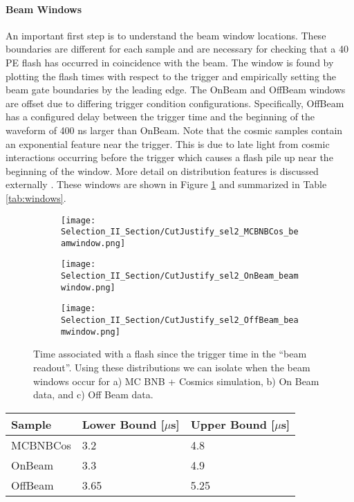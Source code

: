 \noindent \paragraph{Beam Windows} An important first step is to understand the beam window locations. These boundaries are different for each sample and are necessary for checking that a 40 PE flash has occurred in coincidence with the beam. The window is found by plotting the flash times with respect to the trigger and empirically setting the beam gate boundaries by the leading edge. The OnBeam and OffBeam windows are offset due to differing trigger condition configurations. Specifically, OffBeam has a configured delay between the trigger time and the beginning of the waveform of 400 ns larger than OnBeam. Note that the cosmic samples contain an exponential feature near the trigger. This is due to late light from cosmic interactions occurring before the trigger which causes a flash pile up near the beginning of the window. More detail on distribution features is discussed externally \cite{bib:davidcpot}. These windows are shown in Figure \ref{fig:misc_beamwindows} and summarized in Table \ref{tab:windows}.

\begin{figure}[h!]
\begin{subfigure}[b]{0.3\textwidth}
\texttt{[image: Selection\_II\_Section/CutJustify\_sel2\_MCBNBCos\_beamwindow.png]}
\caption{ }
\end{subfigure}
\hspace{3mm}
\begin{subfigure}[b]{0.3\textwidth}
\texttt{[image: Selection\_II\_Section/CutJustify\_sel2\_OnBeam\_beamwindow.png]}
\caption{ }
\end{subfigure}
\hspace{3mm}
\begin{subfigure}[b]{0.3\textwidth}
\texttt{[image: Selection\_II\_Section/CutJustify\_sel2\_OffBeam\_beamwindow.png]}
\caption{ }
\end{subfigure}
\caption{Time associated with a flash since the trigger time in the ``beam readout''. Using these distributions we can isolate when the beam windows occur for a) MC BNB + Cosmics simulation, b) On Beam data, and c) Off Beam data.}
\label{fig:misc_beamwindows}
\end{figure}

\begin{table} 
 \centering
 \begin{tabular}{| l | l | l |}
  \hline
 Sample & Lower Bound [$\mu$s] & Upper Bound [$\mu$s] \\ [0.1ex] \hline
MCBNBCos & 3.2 & 4.8 \\ 
OnBeam & 3.3 & 4.9   \\ 
OffBeam & 3.65 & 5.25 \\ \hline
\end{tabular}
\end{table}

